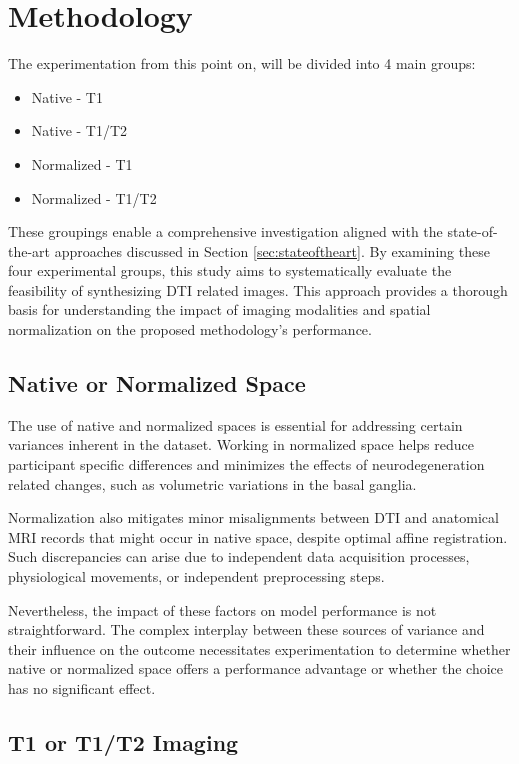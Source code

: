\section{Methodology}

The experimentation from this point on, will be divided into 4 main groups:
\begin{itemize}
  \item Native - T1
  \item Native - T1/T2
  \item Normalized - T1
  \item Normalized - T1/T2
\end{itemize}

These groupings enable a comprehensive investigation aligned with the state-of-the-art approaches discussed in Section \ref{sec:stateoftheart}. By examining these four experimental groups, this study aims to systematically evaluate the feasibility of synthesizing \ac{DTI} related images. This approach provides a thorough basis for understanding the impact of imaging modalities and spatial normalization on the proposed methodology's performance.

\subsection{Native or Normalized Space}

The use of native and normalized spaces is essential for addressing certain variances inherent in the dataset. Working in normalized space helps reduce participant specific differences and minimizes the effects of neurodegeneration related changes, such as volumetric variations in the basal ganglia.\par
Normalization also mitigates minor misalignments between \ac{DTI} and anatomical \ac{MRI} records that might occur in native space, despite optimal affine registration. Such discrepancies can arise due to independent data acquisition processes, physiological movements, or independent preprocessing steps.\par
Nevertheless, the impact of these factors on model performance is not straightforward. The complex interplay between these sources of variance and their influence on the outcome necessitates experimentation to determine whether native or normalized space offers a performance advantage or whether the choice has no significant effect.

\subsection{T1 or T1/T2 Imaging}

